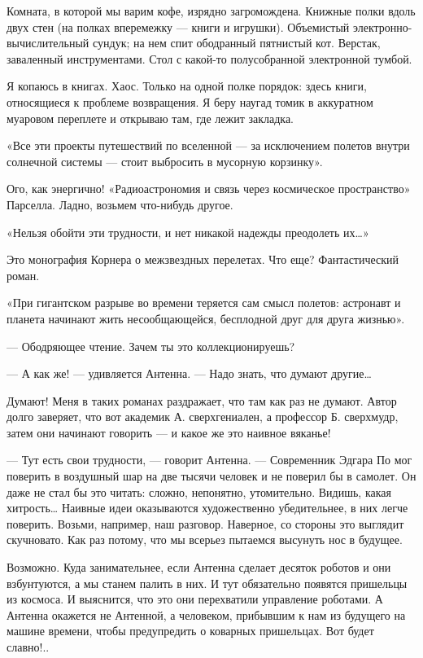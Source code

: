    Комната, в  которой мы  варим кофе,  изрядно загромождена.  Книжные  полки
   вдоль двух  стен (на  полках  вперемежку —  книги и  игрушки).  Объемистый
   электронно-вычислительный сундук; на  нем спит  ободранный пятнистый  кот.
   Верстак,  заваленный   инструментами.   Стол  с   какой-то   полусобранной
   электронной тумбой.

   Я копаюсь в  книгах. Хаос.  Только на  одной полке  порядок: здесь  книги,
   относящиеся к  проблеме  возвращения. Я  беру  наугад томик  в  аккуратном
   муаровом переплете и открываю там, где лежит закладка.

   «Все эти проекты путешествий по вселенной — за исключением полетов  внутри
   солнечной системы — стоит выбросить в мусорную корзинку».

   Ого,  как   энергично!   «Радиоастрономия  и   связь   через   космическое
   пространство» Парселла. Ладно, возьмем что-нибудь другое.

   «Нельзя обойти эти трудности, и нет никакой надежды преодолеть их…»

   Это монография Корнера  о межзвездных перелетах.  Что еще?  Фантастический
   роман.

   «При гигантском разрыве во времени теряется сам смысл полетов: астронавт и
   планета начинают жить несообщающейся, бесплодной друг для друга жизнью».

   — Ободряющее чтение. Зачем ты это коллекционируешь?

   — А как же! — удивляется Антенна. — Надо знать, что думают другие…

   Думают! Меня в таких романах раздражает, что там как раз не думают.  Автор
   долго  заверяет,  что  вот  академик  А.  сверхгениален,  а  профессор  Б.
   сверхмудр, затем они начинают говорить — и какое же это наивное вяканье!

   — Тут есть свои трудности, — говорит Антенна. — Современник Эдгара По  мог
   поверить в воздушный шар на две тысячи человек и не поверил бы в  самолет.
   Он даже не  стал бы  это читать: сложно,  непонятно, утомительно.  Видишь,
   какая хитрость… Наивные идеи оказываются художественно убедительнее, в них
   легче поверить. Возьми, например, наш  разговор. Наверное, со стороны  это
   выглядит скучновато. Как раз потому, что мы всерьез пытаемся высунуть  нос
   в будущее.

   Возможно. Куда занимательнее, если Антенна  сделает десяток роботов и  они
   взбунтуются, а  мы  станем  палить  в  них.  И  тут  обязательно  появятся
   пришельцы из  космоса. И  выяснится, что  это они  перехватили  управление
   роботами. А Антенна окажется не Антенной, а человеком, прибывшим к нам  из
   будущего на машине времени, чтобы предупредить о коварных пришельцах.  Вот
   будет славно!..

